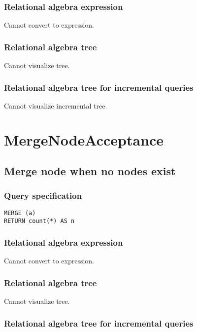 \subsubsection*{Relational algebra expression}

Cannot convert to expression.

\subsubsection*{Relational algebra tree}

Cannot visualize tree.

\subsubsection*{Relational algebra tree for incremental queries}

Cannot visualize incremental tree.

\section{MergeNodeAcceptance}

\subsection{Merge node when no nodes exist}

\subsubsection*{Query specification}

\begin{lstlisting}
MERGE (a)
RETURN count(*) AS n
\end{lstlisting}

\subsubsection*{Relational algebra expression}

Cannot convert to expression.

\subsubsection*{Relational algebra tree}

Cannot visualize tree.

\subsubsection*{Relational algebra tree for incremental queries}

